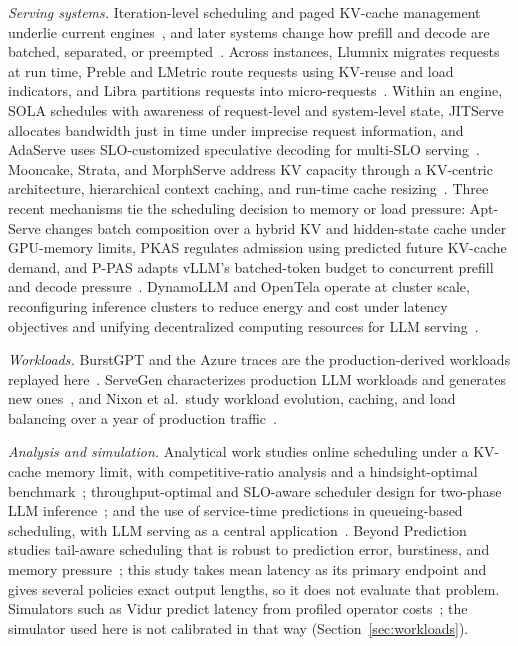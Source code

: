 \documentclass[preprint,12pt]{elsarticle}
\begin{document}
\emph{Serving systems.} Iteration-level scheduling and paged KV-cache
management underlie current engines~\cite{orca2022,vllm2023}, and later systems
change how prefill and decode are batched, separated, or
preempted~\cite{sarathi2024,distserve2024,splitwise2024,fastserve2026}. Across
instances, Llumnix migrates requests at run time, Preble and LMetric route
requests using KV-reuse and load indicators, and Libra partitions requests into
micro-requests~\cite{llumnix2024,preble2025,lmetric2026,libra2026}. Within an
engine, SOLA schedules with awareness of request-level and system-level state,
JITServe allocates bandwidth just in time under imprecise request information,
and AdaServe uses SLO-customized speculative decoding for multi-SLO
serving~\cite{sola2025,jitserve2026,adaserve2026}. Mooncake, Strata, and
MorphServe address KV capacity through a KV-centric architecture, hierarchical
context caching, and run-time cache resizing~\cite{mooncake2025,strata2025,morphserve2025}.
Three recent mechanisms tie the scheduling decision to memory or load pressure:
Apt-Serve changes batch composition over a hybrid KV and hidden-state cache under
GPU-memory limits, PKAS regulates admission using predicted future KV-cache
demand, and P-PAS adapts vLLM's batched-token budget to concurrent prefill and
decode pressure~\cite{aptserve2025,pkas2026,ppas2026}. DynamoLLM and
OpenTela operate at cluster scale, reconfiguring inference clusters to reduce
energy and cost under latency objectives and unifying decentralized computing
resources for LLM serving~\cite{dynamollm2025,opentela2026}.

\emph{Workloads.} BurstGPT and the Azure traces are the production-derived
workloads replayed here~\cite{burstgpt2025,azurepublicdataset2023}. ServeGen
characterizes production LLM workloads and generates new
ones~\cite{servegen2025}, and Nixon et al.\ study workload evolution, caching, and
load balancing over a year of production traffic~\cite{yearllmserving2026}.

\emph{Analysis and simulation.} Analytical work studies online scheduling under
a KV-cache memory limit, with competitive-ratio analysis and a hindsight-optimal
benchmark~\cite{jaillet2025online}; throughput-optimal and SLO-aware scheduler
design for two-phase LLM inference~\cite{bari2025optimal}; and the use of
service-time predictions in queueing-based scheduling, with LLM serving as a
central application~\cite{mitzenmacher2025queueing}. Beyond Prediction studies
tail-aware scheduling that is robust to prediction error, burstiness, and memory
pressure~\cite{beyondprediction2026}; this study takes mean latency as its
primary endpoint and gives several policies exact output lengths, so it does not
evaluate that problem. Simulators such as Vidur predict
latency from profiled operator costs~\cite{vidur2024}; the simulator used here
is not calibrated in that way (Section~\ref{sec:workloads}).
\end{document}
